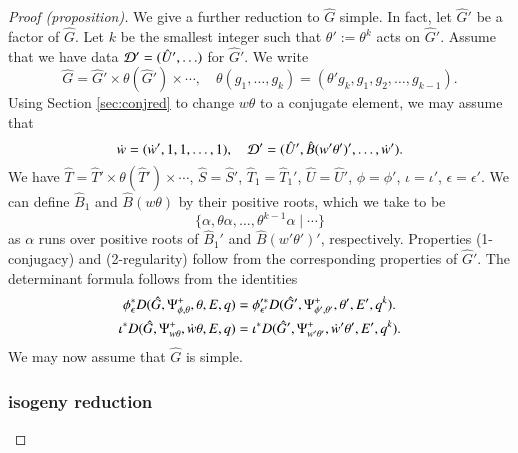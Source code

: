 \begin{proof}[Proof (proposition)]
  We give a further reduction to $\hat G$ simple.  In fact, let
  $\hat G'$ be a factor of $\hat G$.  Let $k$ be the smallest integer
  such that $\theta':=\theta^k$ acts on $\hat G'$.  Assume that we
  have data $\mathcal D'=(\hat U',\ldots)$ for $\hat G'$.  We write
  \[
  \hat G = \hat G' \times \theta(\hat G') \times \cdots,
  \quad
  \theta(g_1,\ldots,g_k) = (\theta' g_k, g_1,g_2,\ldots,g_{k-1}).
  \]
  Using Section \ref{sec:conjred} to change $w\theta$ to a conjugate
  element, we may assume that
  \[
  \dot w = (\dot w',1,1,\ldots,1),\quad \mathcal D' 
  = (\hat U',\hat B(w'\theta')',\ldots,\dot w').
  \]
  We have $\hat T = \hat T'\times \theta(\hat T')\times \cdots$, $\hat
  S = \hat S'$, $\hat T_1 = \hat T_1'$, $\hat U = \hat U'$,
  $\phi=\phi'$, $\iota=\iota'$, $\epsilon = \epsilon'$.  We can define
  $\hat B_1$ and $\hat B(w\theta)$ by their positive roots, which we
  take to be
  \[
  \{\alpha,\theta\alpha,\ldots,\theta^{k-1}\alpha\mid \cdots\}
  \]
  as $\alpha$ runs over positive roots of $\hat B_1'$ and $\hat B(
  w'\theta')'$, respectively.  Properties (1-conjugacy) and
  (2-regularity) follow from the corresponding properties of $\hat
  G'$.  The determinant formula follows from the identities
  \begin{align*}
    \phi^*_\epsilon D(\hat G,\Psi_{\phi,\theta}^+,\theta,E,q) &=
    \phi'^*_{\epsilon'} D(\hat G',\Psi_{\phi',\theta'}^+,\theta',E',q^k).\\
    \iota^* D(\hat G,\Psi_{w\theta}^+,\dot w\theta,E,q) &=
    \iota^* D(\hat G',\Psi_{w'\theta'}^+,\dot w'\theta',E',q^k).
    \end{align*}
    We may now assume that $\hat G$ is simple.

\subsubsection{isogeny reduction}


\end{proof}

